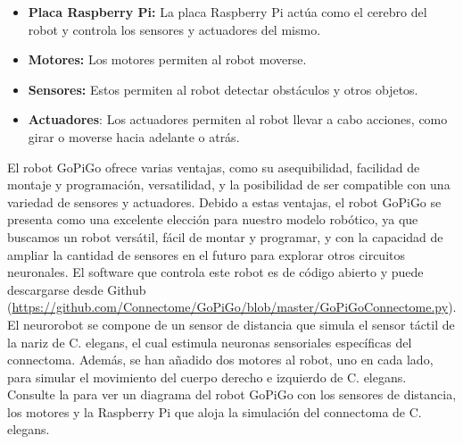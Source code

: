 \begin{itemize}
	\item \textbf{Placa Raspberry Pi:} La placa Raspberry Pi actúa como el cerebro del robot y controla los sensores y actuadores del mismo.
	\item \textbf{Motores: } Los motores permiten al robot moverse.
	\item \textbf{Sensores:} Estos permiten al robot detectar obstáculos y otros objetos.
	\item \textbf{Actuadores}: Los actuadores permiten al robot llevar a cabo acciones, como girar o moverse hacia adelante o atrás.
\end{itemize}


El robot GoPiGo ofrece varias ventajas, como su asequibilidad, facilidad de montaje y programación, versatilidad, y la posibilidad de ser compatible con una variedad de sensores y actuadores. Debido a estas ventajas, el robot GoPiGo se presenta como una excelente elección para nuestro modelo robótico, ya que buscamos un robot versátil, fácil de montar y programar, y con la capacidad de ampliar la cantidad de sensores en el futuro para explorar otros circuitos neuronales. El software que controla este robot es de código abierto y puede descargarse desde Github  (\url{https://github.com/Connectome/GoPiGo/blob/master/GoPiGoConnectome.py}).  El neurorobot se compone de un sensor de distancia que simula el sensor táctil de la nariz de C. elegans, el cual estimula neuronas sensoriales específicas del connectoma. Además, se han añadido dos motores al robot, uno en cada lado, para simular el movimiento del cuerpo derecho e izquierdo de C. elegans. Consulte la  para ver un diagrama del robot GoPiGo con los sensores de distancia, los motores y la Raspberry Pi que aloja la simulación del connectoma de C. elegans.


